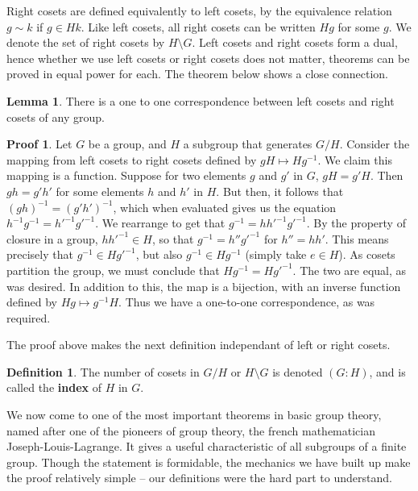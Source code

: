 \documentclass[12pt]{amsbook}
\theoremstyle{definition}
\newtheorem{lemma}[theorem]{Lemma}
\newtheorem{definition}{Definition}
\newtheorem*{prf}{Proof}
\begin{document}
Right cosets are defined equivalently to left cosets, by the equivalence relation $g \sim k$ if $g \in Hk$. Like left cosets, all right cosets can be written $Hg$ for some $g$. We denote the set of right cosets by $H \setminus G$. Left cosets and right cosets form a dual, hence whether we use left cosets or right cosets does not matter, theorems can be proved in equal power for each. The theorem below shows a close connection.

\begin{lemma} There is a one to one correspondence between left cosets and right cosets of any group. \end{lemma}
\begin{prf}
Let $G$ be a group, and $H$ a subgroup that generates $G/H$. Consider the mapping from left cosets to right cosets defined by $gH \mapsto Hg^{-1}$. We claim this mapping is a function. Suppose for two elements $g$ and $g'$ in $G$, $gH = g'H$. Then $gh = g'h'$ for some elements $h$ and $h'$ in $H$. But then, it follows that $(gh)^{-1} = (g'h')^{-1}$, which when evaluated gives us the equation $h^{-1}g^{-1} = h'^{-1}g'^{-1}$. We rearrange to get that $g^{-1} = hh'^{-1}g'^{-1}$. By the property of closure in a group, $hh'^{-1} \in H$, so that $g^{-1} = h''g'^{-1}$ for $h'' = hh'$. This means precisely that $g^{-1} \in Hg'^{-1}$, but also $g^{-1} \in Hg^{-1}$ (simply take $e \in H$). As cosets partition the group, we must conclude that $Hg^{-1} = Hg'^{-1}$. The two are equal, as was desired. In addition to this, the map is a bijection, with an inverse function defined by $Hg \mapsto g^{-1}H$. Thus we have a one-to-one correspondence, as was required.
\end{prf}

The proof above makes the next definition independant of left or right cosets.

\begin{definition}
    The number of cosets in $G/H$ or $H \setminus G$ is denoted $(G:H)$, and is called the {\bf index}  of $H$ in $G$.
\end{definition}

We now come to one of the most important theorems in basic group theory, named after one of the pioneers of group theory, the french mathematician Joseph-Louis-Lagrange. It gives a useful characteristic of all subgroups of a finite group. Though the statement is formidable, the mechanics we have built up make the proof relatively simple -- our definitions were the hard part to understand.
\end{document}
